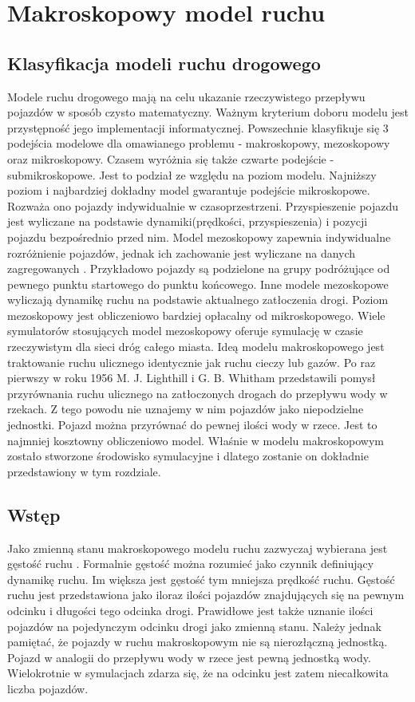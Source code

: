 \documentclass[12pt]{book}
\theoremstyle{plain}
\begin{document}
\chapter{Makroskopowy model ruchu} \label{chapter:makroskopowy_model_ruchu}
\section{Klasyfikacja modeli ruchu drogowego}
Modele ruchu drogowego mają na celu ukazanie rzeczywistego przepływu pojazdów w sposób czysto matematyczny. Ważnym kryterium doboru modelu jest przystępność jego implementacji informatycznej. Powszechnie klasyfikuje się 3 podejścia modelowe dla omawianego problemu \cite{CompareModels} - makroskopowy, mezoskopowy oraz mikroskopowy. Czasem \cite{multilevel} wyróżnia się także czwarte podejście - submikroskopowe. Jest to podział ze względu na poziom modelu. Najniższy poziom i najbardziej dokładny model gwarantuje podejście mikroskopowe. Rozważa ono pojazdy indywidualnie w czasoprzestrzeni. Przyspieszenie pojazdu jest wyliczane na podstawie dynamiki(prędkości, przyspieszenia) i pozycji pojazdu bezpośrednio przed nim. Model mezoskopowy zapewnia indywidualne rozróżnienie pojazdów, jednak ich zachowanie jest wyliczane na danych zagregowanych \cite{mesoscopic}. Przykładowo pojazdy są podzielone na grupy podróżujące od pewnego punktu startowego do punktu końcowego. Inne modele \cite{mesoscopic2} mezoskopowe wyliczają dynamikę ruchu na podstawie aktualnego zatłoczenia drogi. Poziom mezoskopowy jest obliczeniowo bardziej opłacalny od mikroskopowego.
Wiele symulatorów stosujących model mezoskopowy oferuje symulację w czasie rzeczywistym dla sieci dróg całego miasta\cite{vu2017high}. Ideą modelu makroskopowego jest traktowanie ruchu ulicznego identycznie jak ruchu cieczy lub gazów. Po raz pierwszy w roku 1956 M. J. Lighthill i G. B. Whitham \cite{lwr} przedstawili pomysł przyrównania ruchu ulicznego na zatłoczonych drogach do przepływu wody w rzekach. Z tego powodu nie uznajemy w nim pojazdów jako niepodzielne jednostki. Pojazd można przyrównać do pewnej ilości wody w rzece.
Jest to najmniej kosztowny obliczeniowo model. Właśnie w modelu makroskopowym zostało stworzone środowisko symulacyjne i dlatego zostanie on dokładnie przedstawiony w tym rozdziale.

\section{Wstęp}
Jako zmienną stanu makroskopowego modelu ruchu zazwyczaj wybierana jest gęstość ruchu \cite{gottlich,CompareModels}. Formalnie gęstość można rozumieć jako czynnik definiujący dynamikę ruchu. Im większa jest gęstość tym mniejsza prędkość ruchu. Gęstość ruchu \cite{helbing2001master} jest przedstawiona jako iloraz ilości pojazdów znajdujących się na pewnym odcinku i długości tego odcinka drogi. Prawidłowe jest także uznanie ilości pojazdów na pojedynczym odcinku drogi jako zmienną stanu. Należy jednak pamiętać, że pojazdy w ruchu makroskopowym nie są nierozłączną jednostką. Pojazd w analogii do przepływu wody w rzece jest pewną jednostką wody. Wielokrotnie w symulacjach zdarza się, że na odcinku jest zatem niecałkowita liczba pojazdów.
\end{document}
